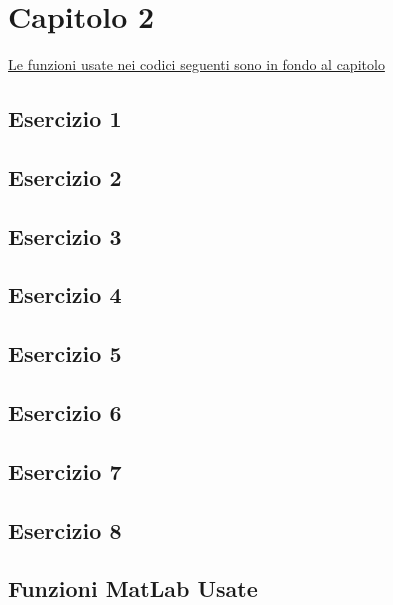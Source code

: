 \section{\textbf{Capitolo 2}}
\underline{Le funzioni usate nei codici seguenti sono in fondo al capitolo}
\subsection{Esercizio 1}

\subsection{Esercizio 2}

\subsection{Esercizio 3}

\subsection{Esercizio 4}

\subsection{Esercizio 5}

\subsection{Esercizio 6}

\subsection{Esercizio 7}

\subsection{Esercizio 8}

\subsection{Funzioni MatLab Usate}
